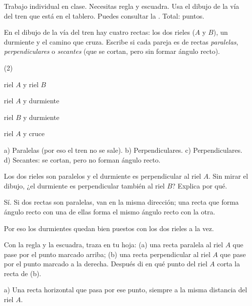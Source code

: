 \documentclass[11pt]{article}
\begin{document}
\encabezado

\begin{instrucciones}
Trabajo individual en clase. Necesitas regla y escuadra. Usa el dibujo de la vía del tren que
está en el tablero. Puedes consultar la .
Total: \totalpuntos{} puntos.
\end{instrucciones}

\begin{preguntas}

\pregunta[1.5] En el dibujo de la vía del tren hay cuatro rectas: los dos rieles ($A$ y $B$),
un durmiente y el camino que cruza. Escribe si cada pareja es de rectas \emph{paralelas},
\emph{perpendiculares} o \emph{secantes} (que se cortan, pero sin formar ángulo recto).
\begin{opciones*}(2)
  \item riel $A$ y riel $B$
  \item riel $A$ y durmiente
  \item riel $B$ y durmiente
  \item riel $A$ y cruce
\end{opciones*}
\begin{solucion}[4cm]
a) Paralelas (por eso el tren no se sale). \quad b) Perpendiculares. \quad
c) Perpendiculares. \quad d) Secantes: se cortan, pero no forman ángulo recto.
\end{solucion}

\pregunta[1] Los dos rieles son paralelos y el durmiente es perpendicular al riel $A$. Sin
mirar el dibujo, ¿el durmiente es perpendicular también al riel $B$? Explica por qué.
\begin{solucion}[3.5cm]
Sí. Si dos rectas son paralelas, van en la misma dirección; una recta que forma ángulo recto
con una de ellas forma el mismo ángulo recto con la otra.

Por eso los durmientes quedan bien puestos con los dos rieles a la vez.
\end{solucion}

\pregunta[1.5] Con la regla y la escuadra, traza en tu hoja: (a) una recta paralela al riel
$A$ que pase por el punto marcado arriba; (b) una recta perpendicular al riel $A$ que pase por
el punto marcado a la derecha. Después di en qué punto del riel $A$ corta la recta de (b).
\begin{solucion}[5cm]
a) Una recta horizontal que pasa por ese punto, siempre a la misma distancia del riel $A$.


\end{solucion}
\end{preguntas}
\end{document}

